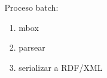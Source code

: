 \documentclass[spanish,notes=hide]{beamer}
\begin{document}
{\begin{columns}
\begin{column}{0.5\textwidth}
\begin{center}
	\end{center}
   \end{column}
   \begin{column}{0.5\textwidth}
	\begin{Large}Proceso batch:\end{Large}
	\begin{enumerate}
	 \item<2-> mbox
	 \item<3-> parsear
	 \item<4-> serializar a RDF/XML 
	\end{enumerate}
   \end{column}
  \end{columns}
}
\end{document}

